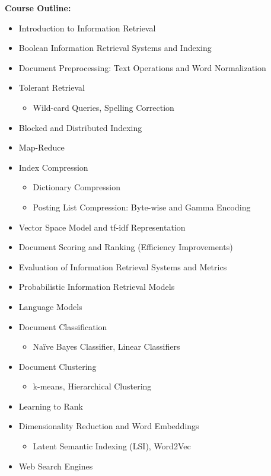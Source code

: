\documentclass[12pt]{article}
\begin{document}
\textbf{Course Outline:}
\begin{itemize}
    \item Introduction to Information Retrieval
    \item Boolean Information Retrieval Systems and Indexing
    \item Document Preprocessing: Text Operations and Word Normalization
    \item Tolerant Retrieval
    \begin{itemize}
        \item Wild-card Queries, Spelling Correction
    \end{itemize}
    \item Blocked and Distributed Indexing
    \item Map-Reduce
    \item Index Compression
    \begin{itemize}
        \item Dictionary Compression
        \item Posting List Compression: Byte-wise and Gamma Encoding
    \end{itemize}
    \item Vector Space Model and tf-idf Representation
    \item Document Scoring and Ranking (Efficiency Improvements)
    \item Evaluation of Information Retrieval Systems and Metrics
    \item Probabilistic Information Retrieval Models
    \item Language Models
    \item Document Classification
    \begin{itemize}
        \item Naïve Bayes Classifier, Linear Classifiers
    \end{itemize}
    \item Document Clustering
    \begin{itemize}
        \item k-means, Hierarchical Clustering
    \end{itemize}
    \item Learning to Rank
    \item Dimensionality Reduction and Word Embeddings
    \begin{itemize}
        \item Latent Semantic Indexing (LSI), Word2Vec
    \end{itemize}
    \item Web Search Engines

\end{itemize}
\end{document}
